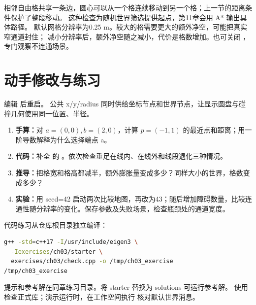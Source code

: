 相邻自由格共享一条边，圆心可以从一个格连续移动到另一个格；上一节的距离条件保护了整段移动。
这种检查为随机世界筛选提供起点，第11章会用 A* 输出具体路径。
默认网格分辨率为0.25 m。较大的格需要更大的额外净空，可能把真实窄通道封住；
减小分辨率后，额外净空随之减小，代价是格数增加。也可关闭 ，专门观察不连通场景。

\section{动手修改与练习}
编辑  后重启。
公共 x/y/radius 同时供给坐标节点和世界节点，让显示圆盘与碰撞几何使用同一位置、半径。
\begin{enumerate}
\item \textbf{手算：}对 $a=(0,0),b=(2,0)$，计算 $p=(-1,1)$ 的最近点和距离；用一阶导数解释为什么选择端点 a。
\item \textbf{代码：}补全  的 。依次检查垂足在线内、在线外和线段退化三种情况。
\item \textbf{推导：}把格宽和格高都减半，额外膨胀量变成多少？同样大小的世界，格数变成多少？
\item \textbf{实验：}用 seed=42 启动两次比较地图，再改为43；随后增加障碍数量，比较连通性随分辨率的变化。保存参数及失败场景，检查瓶颈处的通道宽度。
\end{enumerate}
代码练习从仓库根目录独立编译：
\begin{lstlisting}[language=bash,numbers=none]
g++ -std=c++17 -I/usr/include/eigen3 \
  -Iexercises/ch03/starter \
  exercises/ch03/check.cpp -o /tmp/ch03_exercise
/tmp/ch03_exercise
\end{lstlisting}
提示和参考解在同章练习目录。将 starter 替换为 solutions 可运行参考解。
使用  检查正式库；演示运行时，在工作空间执行
 核对默认世界消息。

